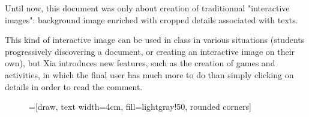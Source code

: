 Until now, this document was only about creation of traditionnal "interactive images": 
background image enriched with cropped details associated with texts.

This kind of interactive image can be used in class in various situations 
(students progressively discovering a document, or creating an interactive image
on their own), but Xia introduces new features, 
such as the creation of games and activities, in which the final user 
has much more to do than simply clicking on details in order to read the comment.

\begin{figure}[htp]
=[draw, text width=4cm, fill=lightgray!50, rounded corners]
\end{figure}
